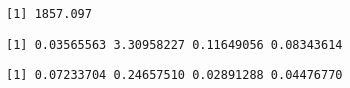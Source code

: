 \documentclass[]{book}
\newenvironment{Shaded}{\begin{snugshade}}{\end{snugshade}}
\newcommand{\KeywordTok}[1]{\textcolor[rgb]{0.13,0.29,0.53}{\textbf{#1}}}
\newcommand{\OperatorTok}[1]{\textcolor[rgb]{0.81,0.36,0.00}{\textbf{#1}}}
\newcommand{\NormalTok}[1]{#1}
\begin{document}
\begin{verbatim}
[1] 1857.097
\end{verbatim}

\begin{Shaded}
\end{Shaded}

\begin{verbatim}
[1] 0.03565563 3.30958227 0.11649056 0.08343614
\end{verbatim}

\begin{Shaded}
\end{Shaded}

\begin{verbatim}
[1] 0.07233704 0.24657510 0.02891288 0.04476770
\end{verbatim}
\end{document}

